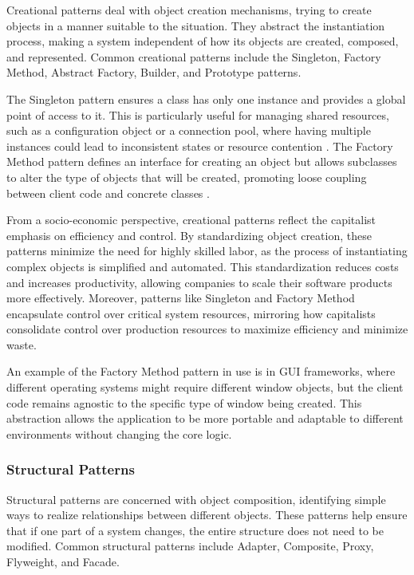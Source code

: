 \begin{refsection}
Creational patterns deal with object creation mechanisms, trying to create objects in a manner suitable to the situation. They abstract the instantiation process, making a system independent of how its objects are created, composed, and represented. Common creational patterns include the Singleton, Factory Method, Abstract Factory, Builder, and Prototype patterns.

The Singleton pattern ensures a class has only one instance and provides a global point of access to it. This is particularly useful for managing shared resources, such as a configuration object or a connection pool, where having multiple instances could lead to inconsistent states or resource contention \cite[pp.~127-130]{Gamma2015}. The Factory Method pattern defines an interface for creating an object but allows subclasses to alter the type of objects that will be created, promoting loose coupling between client code and concrete classes \cite[pp.~107-109]{Gamma2015}.

From a socio-economic perspective, creational patterns reflect the capitalist emphasis on efficiency and control. By standardizing object creation, these patterns minimize the need for highly skilled labor, as the process of instantiating complex objects is simplified and automated. This standardization reduces costs and increases productivity, allowing companies to scale their software products more effectively. Moreover, patterns like Singleton and Factory Method encapsulate control over critical system resources, mirroring how capitalists consolidate control over production resources to maximize efficiency and minimize waste.

An example of the Factory Method pattern in use is in GUI frameworks, where different operating systems might require different window objects, but the client code remains agnostic to the specific type of window being created. This abstraction allows the application to be more portable and adaptable to different environments without changing the core logic.

\subsubsection{Structural Patterns}

Structural patterns are concerned with object composition, identifying simple ways to realize relationships between different objects. These patterns help ensure that if one part of a system changes, the entire structure does not need to be modified. Common structural patterns include Adapter, Composite, Proxy, Flyweight, and Facade.


\end{refsection}
